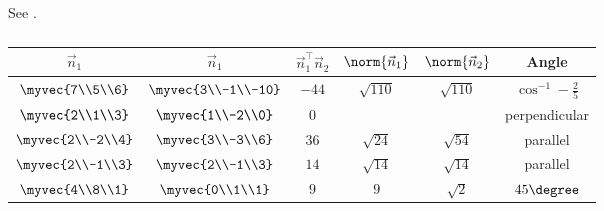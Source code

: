     See .
\begin{table}[H]
    \centering
    \caption{}
    \label{tab:12/11/3/13}
    \begin{tabular}{|c|c|c|c|c|c|}
        \hline
        $\vec{n}_1$ & $\vec{n}_1$ & $\vec{n}_1^{\top}\vec{n}_2$ & $\norm{\vec{n}_1}$ & $\norm{\vec{n}_2}$ & Angle\\
        \hline
        $\myvec{7\\5\\6}$ & $\myvec{3\\-1\\-10}$ & $-44$ & $\sqrt{110}$ & $\sqrt{110}$ & $\cos^{-1}-\frac{2}{5}$ \\
        \hline
        $\myvec{2\\1\\3}$ & $\myvec{1\\-2\\0}$ & $0$ & & & perpendicular \\
        \hline
        $\myvec{2\\-2\\4}$ & $\myvec{3\\-3\\6}$ & $36$ & $\sqrt{24}$ & $\sqrt{54}$ & parallel \\
        \hline
        $\myvec{2\\-1\\3}$ & $\myvec{2\\-1\\3}$ & $14$ & $\sqrt{14}$ & $\sqrt{14}$ & parallel \\
        \hline
        $\myvec{4\\8\\1}$ & $\myvec{0\\1\\1}$ & $9$ & $9$ & $\sqrt{2}$ & $45\degree$ \\
        \hline
    \end{tabular}
\end{table}

